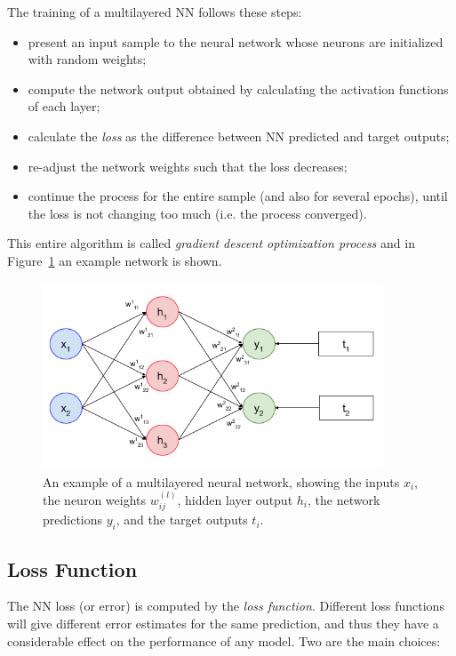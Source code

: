The training of a multilayered NN follows these steps:

\begin{itemize}
\tightlist
\item present an input sample to the neural network whose neurons are initialized with random weights;
\item compute the network output obtained by calculating the activation functions of each layer;
\item calculate the \emph{loss} as the difference between NN predicted and target outputs;
\item re-adjust the network weights such that the loss decreases;
\item continue the process for the entire sample (and also for several epochs), until the loss is not changing too much (i.e. the process converged).
\end{itemize}
This entire algorithm is called \emph{gradient descent optimization process} and in Figure~\ref{fig:training} an example network is shown.

\begin{figure}[htb]
\centering
\includegraphics[width=0.9\textwidth]{figures/training_nn}
\caption{An example of a multilayered neural network, showing the inputs $x_i$, the neuron weights $w^{(l)}_{ij}$, hidden layer output $h_i$, the network predictions $y_i$, and the target outputs $t_i$.}
\label{fig:training}
\end{figure}

\subsection{Loss Function}
The NN loss (or error) is computed by the \emph{loss function}. Different loss functions will give different error estimates for the same prediction, and thus they have a considerable effect on the performance of any model. Two are the main choices:


